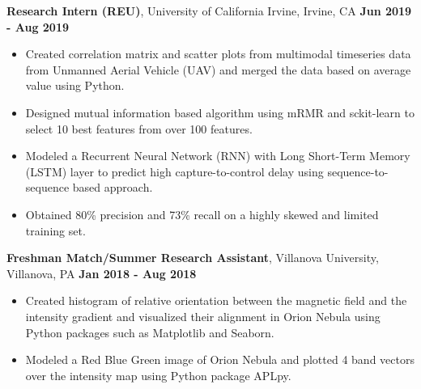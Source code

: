 \documentclass[letterpaper,11pt]{article}
\begin{document}
      {\textbf{Research Intern (REU)}, University of California Irvine, Irvine, CA} 
      \null\hfill \textbf{Jun 2019 - Aug 2019}
      \begin{itemize}
      \itemsep0em 
          \item
            {Created correlation matrix and scatter plots from multimodal timeseries data from Unmanned Aerial Vehicle (UAV) and merged the data based on average value using Python.}
        \item
            {Designed mutual information based algorithm using mRMR and sckit-learn to select 10 best features from over 100 features.}
        \item
            {Modeled a Recurrent Neural Network (RNN) with Long Short-Term Memory (LSTM) layer to predict high capture-to-control delay using sequence-to-sequence based approach.}
        \item
            {Obtained 80\% precision and 73\% recall on a highly skewed and limited training set.}
      \end{itemize}
      
      {\textbf{Freshman Match/Summer Research Assistant}, Villanova University, Villanova, PA}
      \null\hfill \textbf{Jan 2018 - Aug 2018}
      \begin{itemize}
      \itemsep0em 
          \item
            {Created histogram of relative orientation between the magnetic field and the intensity gradient and visualized their alignment in Orion Nebula using Python packages such as Matplotlib and Seaborn.}
        \item
            {Modeled a Red Blue Green image of Orion Nebula and plotted 4 band vectors over the intensity map using Python package APLpy.}
      \end{itemize}


\end{document}

